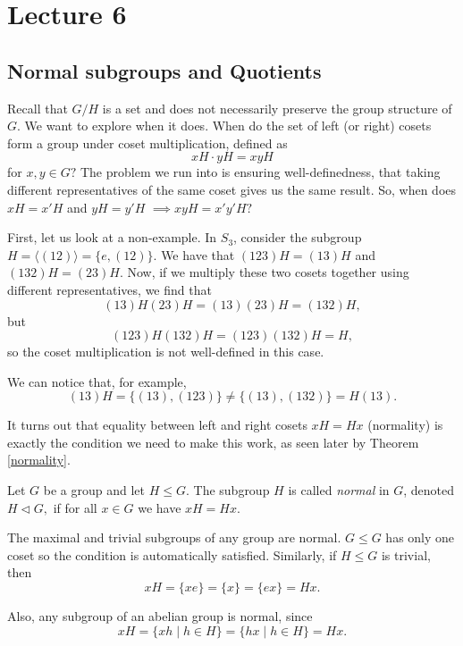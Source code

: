 \section{Lecture 6}
\subsection{Normal subgroups and Quotients}
Recall that $G/H$ is a set and does not necessarily preserve the group structure of $G.$ We want to explore when it does. When do the set of left (or right) cosets form a group under coset multiplication, defined as
$$xH\cdot yH=xyH$$
for $x,y\in G?$ The problem we run into is ensuring well-definedness, that taking different representatives of the same coset gives us the same result. So, when does $xH=x'H$ and $yH=y'H$ $\implies xyH=x'y'H?$

First, let us look at a non-example. In $S_3$, consider the subgroup $H=\langle (12)\rangle =\{e, (12)\}.$ 
We have that $(123)H=(13)H$ and $(132)H=(23)H$.
Now, if we multiply these two cosets together using different representatives, we find that
$$(13)H(23)H=(13)(23)H=(132)H,$$ but
$$(123)H(132)H=(123)(132)H=H,$$
so the coset multiplication is not well-defined in this case. 

We can notice that, for example, $$(13)H = \{(13),(123)\} \neq \{(13),(132)\} = H(13).$$

It turns out that equality between left and right cosets $xH=Hx$ (normality) is exactly the condition we need to make this work, as seen later by Theorem \ref{normality}. 


\begin{definition}
    Let $G$ be a group and let $H\leq G.$ The subgroup $H$ is called \emph{normal} in $G$, denoted $H\triangleleft G,$ if for all $x\in G$ we have $xH=Hx.$ 
\end{definition}

The maximal and trivial subgroups of any group are normal. $G \leq G$ has only one coset so the condition is automatically satisfied. Similarly, if $H \leq G$ is trivial, then $$xH = \{xe\} = \{x\} = \{ex\} = Hx.$$

Also, any subgroup of an abelian group is normal, since
$$
xH = \{xh \mid h\in H \} =  \{hx \mid h\in H \} = Hx. 
$$


